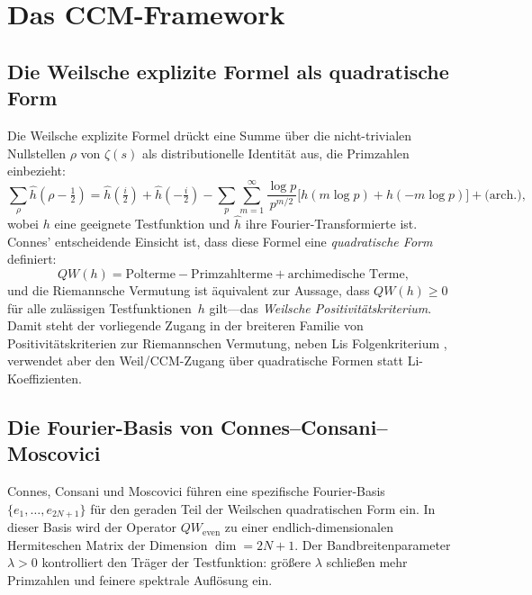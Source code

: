 \documentclass[12pt,a4paper]{article}
\theoremstyle{definition}
\theoremstyle{remark}
\begin{document}
\section{Das CCM-Framework}
\label{sec:framework}

\subsection{Die Weilsche explizite Formel als quadratische Form}

Die Weilsche explizite Formel \cite{Weil1952} drückt eine Summe über die
nicht-trivialen Nullstellen $\rho$ von $\zeta(s)$ als distributionelle Identität
aus, die Primzahlen einbezieht:
\begin{equation}
\label{eq:weil}
\sum_\rho \hat{h}(\rho - \tfrac{1}{2})
= \hat{h}(\tfrac{i}{2}) + \hat{h}(-\tfrac{i}{2})
- \sum_p \sum_{m=1}^\infty \frac{\log p}{p^{m/2}}
  \bigl[h(m\log p) + h(-m\log p)\bigr]
+ \text{(arch.)},
\end{equation}
wobei $h$ eine geeignete Testfunktion und $\hat{h}$ ihre Fourier-Transformierte ist.
Connes' entscheidende Einsicht \cite{Connes1999} ist, dass diese Formel eine
\emph{quadratische Form} definiert:
\begin{equation}
\label{eq:QW-def}
QW(h) = \text{Polterme} - \text{Primzahlterme} + \text{archimedische Terme},
\end{equation}
und die Riemannsche Vermutung ist äquivalent zur Aussage, dass
$QW(h) \geq 0$ für alle zulässigen Testfunktionen~$h$ gilt---das
\emph{Weilsche Positivitätskriterium}.
Damit steht der vorliegende Zugang in der breiteren Familie von
Positivitätskriterien zur Riemannschen Vermutung, neben Lis
Folgenkriterium \cite{Li1997}, verwendet aber den Weil/CCM-Zugang über
quadratische Formen statt Li-Koeffizienten.

\subsection{Die Fourier-Basis von Connes--Consani--Moscovici}

Connes, Consani und Moscovici \cite{CCM2025} führen eine spezifische
Fourier-Basis $\{e_1, \ldots, e_{2N+1}\}$ für den geraden Teil der
Weilschen quadratischen Form ein.
In dieser Basis wird der Operator $QW_{\mathrm{even}}$ zu einer
endlich-dimensionalen Hermiteschen Matrix der Dimension $\dim = 2N+1$.
Der Bandbreitenparameter $\lambda > 0$ kontrolliert den Träger der
Testfunktion: größere $\lambda$ schließen mehr Primzahlen und feinere
spektrale Auflösung ein.
\end{document}
